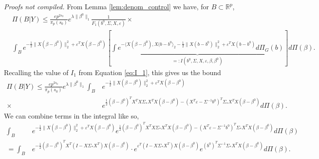 \documentclass[11pt]{article}
\renewenvironment{proof}[1]{\par\noindent{\bf #1 \ }}{\hfill\BlackBox\\[2mm]}
\renewenvironment{proof}[1]{\textit{Proofs not compiled.}}{}
\newcommand{\eps}{\varepsilon}
\newcommand{\R}{\mathbb{R}}
\newcommand{\bezero}{\beta^0}
\newcommand{\Pig}{\Pi_{G}}
\newcommand{\postCov}{\Sigma_*}
\numberwithin{equation}{section}
\begin{document}
\begin{proof}{Proof of Theorem \ref{thm:dimension}.}
From Lemma \ref{lem:denom_control} we have, for $B \subset \R^p$,
\begin{align*}
&\Pi(B | Y) \leq \frac{e p^{2s_0}}{\pi_p(s_0)}e^{\lambda\|\beta^0\|_1} \frac{1}{F_1(b^0, \Sigma, X, \eps)}\times\\
&\int_B e^{-\frac{1}{2}\|X(\beta - \bezero)\|_2^2 + \eps^T X(\beta - \bezero)}\left[\underbrace{\int e^{-\langle X(\beta - \bezero), X(b - b^0\rangle_2 - \frac{1}{2}\|X(b - b^0)\|_2^2 + \eps^T X(b - b^0)} d\Pig(b)}_{=: I(b^0, \Sigma, X, \eps, \beta, \bezero)} \right]d\Pi(\beta) .
\end{align*}
Recalling the value of $I_1$ from Equation \eqref{eq:I_1}, this gives us the bound
\begin{align*}
\Pi(B | Y) \leq \frac{e p^{2s_0}}{\pi_p(s_0)}e^{\lambda\|\beta^0\|_1} \int_B& e^{-\frac{1}{2}\|X(\beta - \bezero)\|_2^2 + \eps^T X(\beta - \bezero)} \\
\times&e^{\frac{1}{2}(\beta - \beta^0)^T X^TX \postCov X^TX(\beta - \beta^0)  - (X^T\eps - \Sigma^{-1}b^0)^T\postCov X^TX(\beta - \beta^0)} d\Pi(\beta).	
\end{align*}
We can combine terms in the integral like so,
\begin{align}
\int_B & e^{-\frac{1}{2}\|X(\beta - \bezero)\|_2^2 + \eps^T X(\beta - \bezero)} e^{\frac{1}{2}(\beta - \beta^0)^T X^TX \postCov X^TX(\beta - \beta^0)  - (X^T\eps - \Sigma^{-1}b^0)^T\postCov X^TX(\beta - \beta^0)} d\Pi(\beta) \nonumber\\
=\int_B &e^{-\frac{1}{2}(\beta - \bezero)^T X^T\left(I - X\postCov X^T \right)X(\beta - \bezero)} 
\cdot  e^{\eps^T (I - X\postCov  X^T)X(\beta - \bezero)} e^{(b^0)^T\Sigma^{-1}\postCov  X^TX (\beta - \bezero)} d\Pi(\beta). \label{eq:int_bound_A}

\end{align}
\end{proof}
\end{document}
